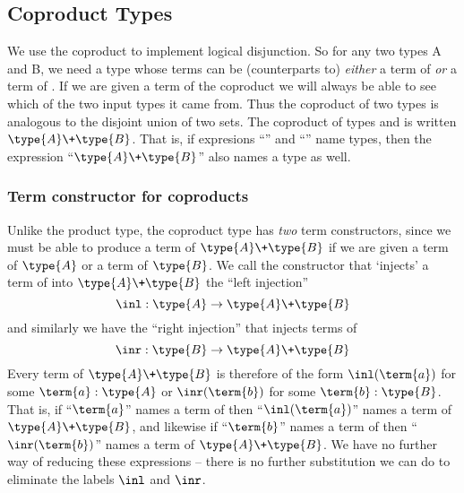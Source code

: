 \subsection{Coproduct Types}
\label{sec:SimpleTT-Coproduct}


We use the coproduct to implement logical disjunction.  
So for any two types A and B, we need a type whose terms can be (counterparts to) \emph{either} a term of  \emph{or} a term of .  If we are given a term of the coproduct we will always be able to see which of the two input types it came from.    
Thus the coproduct of two types is analogous to the disjoint union of two sets.
The coproduct of types  and  is written 
$\type{A} \+ \type{B}$.  That is, if expresions ``'' and ``'' 
name types, then the expression ``$\type{A} \+ \type{B}$'' also names a type as well.




\subsubsection{Term constructor for coproducts}

Unlike the product type, the coproduct type has \emph{two} term constructors, since we must be able to produce a term of $\type{A} \+ \type{B}$ if we are given a term of $\type{A}$ or a term of $\type{B}$.  
We call the constructor that `injects' a term of  into 
$\type{A} \+ \type{B}$ the ``left injection''
\[
\inl: \type{A} \to \type{A} \+ \type{B} 
\]
and similarly we have the ``right injection'' that injects terms of 
\[
\inr: \type{B} \to \type{A} \+ \type{B} 
\]
%
Every term of $\type{A} \+ \type{B}$ is therefore of the form 
$\inl(\term{a})$ for some $\term{a}:\type{A}$
or
$\inr(\term{b})$ for some $\term{b}:\type{B}$.  That is, 
if ``$\term{a}$'' names a term of  then 
``$\inl(\term{a})$'' names a term of $\type{A} \+ \type{B}$, and likewise 
if ``$\term{b}$'' names a term of  then 
``$\inr(\term{b})$'' names a term of $\type{A} \+ \type{B}$.  We have no further way of reducing these expressions -- there is no further substitution we can do to eliminate the labels $\inl$ and $\inr$.


